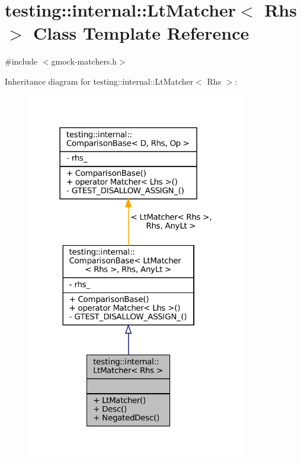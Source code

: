 \hypertarget{classtesting_1_1internal_1_1LtMatcher}{}\section{testing\+:\+:internal\+:\+:Lt\+Matcher$<$ Rhs $>$ Class Template Reference}
\label{classtesting_1_1internal_1_1LtMatcher}


{\ttfamily \#include $<$gmock-\/matchers.\+h$>$}



Inheritance diagram for testing\+:\+:internal\+:\+:Lt\+Matcher$<$ Rhs $>$\+:
\nopagebreak
\begin{figure}[H]
\begin{center}
\leavevmode
\includegraphics[width=273pt]{classtesting_1_1internal_1_1LtMatcher__inherit__graph}
\end{center}
\end{figure}


